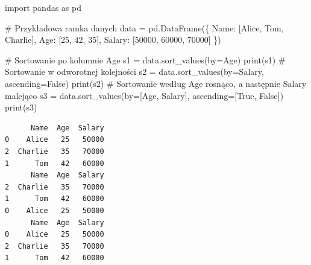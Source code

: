 \documentclass[
  polish,
  letterpaper,
  DIV=11,
  numbers=noendperiod]{scrreprt}
\newenvironment{Shaded}{\begin{snugshade}}{\end{snugshade}}
\newcommand{\BuiltInTok}[1]{\textcolor[rgb]{0.00,0.23,0.31}{#1}}
\newcommand{\CommentTok}[1]{\textcolor[rgb]{0.37,0.37,0.37}{#1}}
\newcommand{\DecValTok}[1]{\textcolor[rgb]{0.68,0.00,0.00}{#1}}
\newcommand{\ImportTok}[1]{\textcolor[rgb]{0.00,0.46,0.62}{#1}}
\newcommand{\NormalTok}[1]{\textcolor[rgb]{0.00,0.23,0.31}{#1}}
\newcommand{\OperatorTok}[1]{\textcolor[rgb]{0.37,0.37,0.37}{#1}}
\newcommand{\StringTok}[1]{\textcolor[rgb]{0.13,0.47,0.30}{#1}}
\newcommand{\VariableTok}[1]{\textcolor[rgb]{0.07,0.07,0.07}{#1}}
\begin{document}
\begin{Shaded}
\begin{Highlighting}[]
\ImportTok{import}\NormalTok{ pandas }\ImportTok{as}\NormalTok{ pd}

\CommentTok{\# Przykładowa ramka danych}
\NormalTok{data }\OperatorTok{=}\NormalTok{ pd.DataFrame(\{}
    \StringTok{\textquotesingle{}Name\textquotesingle{}}\NormalTok{: [}\StringTok{\textquotesingle{}Alice\textquotesingle{}}\NormalTok{, }\StringTok{\textquotesingle{}Tom\textquotesingle{}}\NormalTok{, }\StringTok{\textquotesingle{}Charlie\textquotesingle{}}\NormalTok{],}
    \StringTok{\textquotesingle{}Age\textquotesingle{}}\NormalTok{: [}\DecValTok{25}\NormalTok{, }\DecValTok{42}\NormalTok{, }\DecValTok{35}\NormalTok{],}
    \StringTok{\textquotesingle{}Salary\textquotesingle{}}\NormalTok{: [}\DecValTok{50000}\NormalTok{, }\DecValTok{60000}\NormalTok{, }\DecValTok{70000}\NormalTok{]}
\NormalTok{\})}

\CommentTok{\# Sortowanie po kolumnie \textquotesingle{}Age\textquotesingle{}}
\NormalTok{s1 }\OperatorTok{=}\NormalTok{ data.sort\_values(by}\OperatorTok{=}\StringTok{\textquotesingle{}Age\textquotesingle{}}\NormalTok{)}
\BuiltInTok{print}\NormalTok{(s1)}
\CommentTok{\# Sortowanie w odworotnej kolejności}
\NormalTok{s2 }\OperatorTok{=}\NormalTok{ data.sort\_values(by}\OperatorTok{=}\StringTok{\textquotesingle{}Salary\textquotesingle{}}\NormalTok{, ascending}\OperatorTok{=}\VariableTok{False}\NormalTok{)}
\BuiltInTok{print}\NormalTok{(s2)}
\CommentTok{\# Sortowanie według \textquotesingle{}Age\textquotesingle{} rosnąco, a następnie \textquotesingle{}Salary\textquotesingle{} malejąco}
\NormalTok{s3 }\OperatorTok{=}\NormalTok{ data.sort\_values(by}\OperatorTok{=}\NormalTok{[}\StringTok{\textquotesingle{}Age\textquotesingle{}}\NormalTok{, }\StringTok{\textquotesingle{}Salary\textquotesingle{}}\NormalTok{], ascending}\OperatorTok{=}\NormalTok{[}\VariableTok{True}\NormalTok{, }\VariableTok{False}\NormalTok{])}
\BuiltInTok{print}\NormalTok{(s3)}
\end{Highlighting}
\end{Shaded}

\begin{verbatim}
      Name  Age  Salary
0    Alice   25   50000
2  Charlie   35   70000
1      Tom   42   60000
      Name  Age  Salary
2  Charlie   35   70000
1      Tom   42   60000
0    Alice   25   50000
      Name  Age  Salary
0    Alice   25   50000
2  Charlie   35   70000
1      Tom   42   60000
\end{verbatim}
\end{document}
